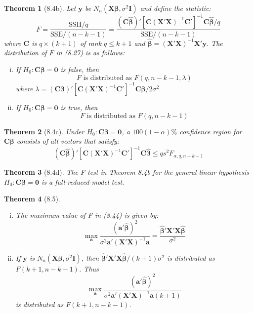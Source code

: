 \documentclass{article}
\newtheorem{theorem}{Theorem}[section]
\begin{document}
\begin{theorem}[8.4b]
Let $\mathbf{y}$ be $N_n(\mathbf{X}\boldsymbol{\beta}, \sigma^2\mathbf{I})$ and define the statistic:
\[F = \frac{\text{SSH}/q}{\text{SSE}/(n-k-1)} = \frac{(\mathbf{C}\hat{\boldsymbol{\beta}})'[\mathbf{C}(\mathbf{X}'\mathbf{X})^{-1}\mathbf{C}']^{-1}\mathbf{C}\hat{\boldsymbol{\beta}}/q}{\text{SSE}/(n-k-1)}\]
where $\mathbf{C}$ is $q \times (k+1)$ of rank $q \leq k+1$ and $\hat{\boldsymbol{\beta}} = (\mathbf{X}'\mathbf{X})^{-1}\mathbf{X}'\mathbf{y}$. The distribution of $F$ in (8.27) is as follows:
\begin{enumerate}[(i)]
\item If $H_0: \mathbf{C}\boldsymbol{\beta} = \mathbf{0}$ is false, then
\[F \text{ is distributed as } F(q,n-k-1,\lambda)\]
where $\lambda = (\mathbf{C}\boldsymbol{\beta})'[\mathbf{C}(\mathbf{X}'\mathbf{X})^{-1}\mathbf{C}']^{-1}\mathbf{C}\boldsymbol{\beta}/2\sigma^2$

\item If $H_0: \mathbf{C}\boldsymbol{\beta} = \mathbf{0}$ is true, then
\[F \text{ is distributed as } F(q,n-k-1)\]
\end{enumerate}
\end{theorem}

\begin{theorem}[8.4c]
Under $H_0: \mathbf{C}\boldsymbol{\beta} = \mathbf{0}$, a $100(1-\alpha)\%$ confidence region for $\mathbf{C}\boldsymbol{\beta}$ consists of all vectors that satisfy:
\[(\mathbf{C}\hat{\boldsymbol{\beta}})'[\mathbf{C}(\mathbf{X}'\mathbf{X})^{-1}\mathbf{C}']^{-1}\mathbf{C}\hat{\boldsymbol{\beta}} \leq qs^2F_{\alpha,q,n-k-1}\]
\end{theorem}

\begin{theorem}[8.4d]
The F test in Theorem 8.4b for the general linear hypothesis $H_0: \mathbf{C}\boldsymbol{\beta} = \mathbf{0}$ is a full-reduced-model test.
\end{theorem}

\begin{theorem}[8.5]
\begin{enumerate}[(i)]
\item The maximum value of F in (8.44) is given by:
\[\max_{\mathbf{a}} \frac{(\mathbf{a}'\hat{\boldsymbol{\beta}})^2}{\sigma^2\mathbf{a}'(\mathbf{X}'\mathbf{X})^{-1}\mathbf{a}} = \frac{\hat{\boldsymbol{\beta}}'\mathbf{X}'\mathbf{X}\hat{\boldsymbol{\beta}}}{\sigma^2}\]
\item If $\mathbf{y}$ is $N_n(\mathbf{X}\boldsymbol{\beta}, \sigma^2\mathbf{I})$, then $\hat{\boldsymbol{\beta}}'\mathbf{X}'\mathbf{X}\hat{\boldsymbol{\beta}}/(k+1)\sigma^2$ is distributed as $F(k+1,n-k-1)$. Thus
\[\max_{\mathbf{a}} \frac{(\mathbf{a}'\hat{\boldsymbol{\beta}})^2}{\sigma^2\mathbf{a}'(\mathbf{X}'\mathbf{X})^{-1}\mathbf{a}(k+1)}\]
is distributed as $F(k+1,n-k-1)$.
\end{enumerate}
\end{theorem}
\end{document}
